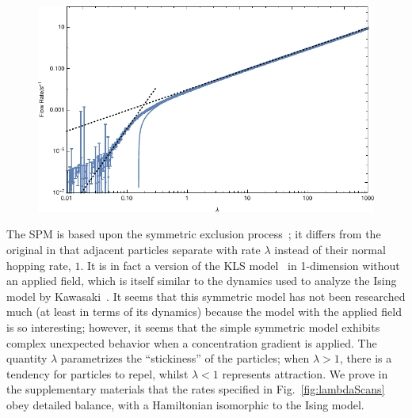 \documentclass[
reprint,
 amsmath,amssymb,
 aps,
 prl,
]{revtex4-1}
\begin{document}
\begin{figure}[h!]
  \includegraphics[width=\linewidth]{logFlowRates}
    \vspace{-1em}
\end{figure}

The SPM is based upon the symmetric exclusion process~\cite{sugden2007dynamically, Kollmann2003,  Lin2005, Hegde2014, Krapivsky2014, Imamura2017};
it differs from the original in that adjacent particles separate with rate $\lambda$
instead of their normal hopping rate, $1$. It is in fact a version of the KLS model~\cite{Katz1984, Zia2010, Kafri2003} in 1-dimension without an applied field, which is itself similar to the dynamics used to analyze the Ising model by
Kawasaki~\cite{PhysRev.145.224}. It seems that this symmetric model has not been researched much (at least in terms of its dynamics) because the model with the applied field is so interesting; however, it seems that the simple symmetric model
exhibits complex unexpected behavior when a concentration gradient is applied. The quantity $\lambda$ parametrizes the ``stickiness'' of the particles; when $\lambda>1$, there is a tendency for particles to repel,
whilst $\lambda < 1$ represents attraction.
We prove in the supplementary materials that the rates specified in Fig.~\ref{fig:lambdaScans} obey detailed balance, with a Hamiltonian isomorphic to the Ising model.
\end{document}
